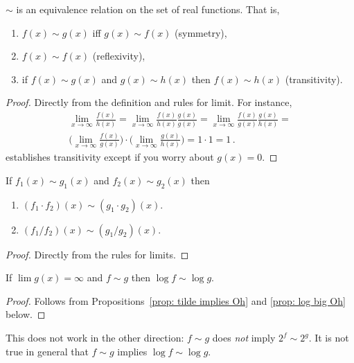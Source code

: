 \documentclass{tstextbook}
\begin{document}
\begin{theorem}
  \(\sim\) is an equivalence relation on the set of real functions.
  That is,
  \begin{enumerate}
    \item \(f(x)\sim g(x)\) iff \(g(x)\sim f(x)\)  (symmetry), 
    \item\(f(x)\sim f(x)\) (reflexivity),
    \item if \(f(x)\sim g(x)\) and  \(g(x)\sim h(x)\) then 
  \(f(x)\sim h(x)\) (transitivity).
  \end{enumerate}
\end{theorem}

\begin{proof}
  Directly from the definition and rules for limit.
  For instance, 
  \begin{multline*}
    \lim_{x\rightarrow \infty} \frac{f(x)}{h(x)} = 
    \lim_{x\rightarrow \infty} \frac{f(x)}{h(x)}\frac{g(x)}{g(x)} =
    \lim_{x\rightarrow \infty} \frac{f(x)}{g(x)}\frac{g(x)}{h(x)} =  \\
    \biggl(\lim_{x\rightarrow \infty} \frac{f(x)}{g(x)}\biggr)\cdot \biggl(\lim_{x\rightarrow \infty} \frac{g(x)}{h(x)} \biggr) =  
    1\cdot 1 
    = 1\,.
  \end{multline*}
  establishes transitivity except if you worry about $g(x) = 0$.
\end{proof}

\begin{theorem}
  If \(f_1(x)\sim g_1(x)\) and \(f_2(x)\sim g_2(x)\)  then 
  \begin{enumerate}
    \item
  \((f_1\cdot f_2)(x)  \sim (g_1\cdot g_2)(x)	\).
    \item
  \((f_1/ f_2)(x)  \sim (g_1 / g_2)(x)	\).
  \end{enumerate}
\end{theorem}
\begin{proof}
  Directly from the rules for limits. 
\end{proof}

\begin{theorem}[logarithm]
  If $\lim g(x)=\infty$ and  \(f\sim g\) then \(\log f \sim \log g\).
\end{theorem}
\begin{proof}
  Follows from Propositions~\ref{prop: tilde implies Oh} and \ref{prop: log big Oh} below.
\end{proof}

This does not work in the other direction: \(f\sim g\) does \emph{not} imply \(2^ f \sim 2^ g\).
It is not true in general that $f\sim g$ implies $\log f\sim \log g$.
\end{document}
